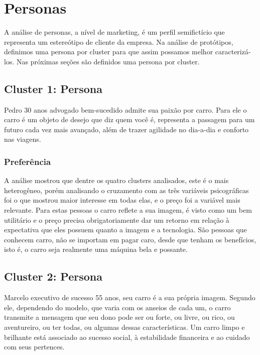 \section{Personas}

A análise de personas, a nível de marketing, é um perfil semifictício
que representa um estereótipo de cliente da empresa. Na análise de
protótipos, definimos uma persona por cluster para que assim possamos
melhor caracterizá-los. Nas próximas seções são definidos uma persona
por cluster.


\subsection{Cluster 1: Persona \nomeCa{}}

Pedro 30 anos advogado bem-sucedido admite sua paixão por carro. Para
ele o carro é um objeto de desejo que diz quem você é, representa
a passagem para um futuro cada vez mais avançado, além de trazer agilidade
no dia-a-dia e conforto nas viagens. 

\subsubsection{Preferência}
A análise mostrou que dentre os quatro clusters analisados, este é o mais heterogêneo,
porém analisando o cruzamento com as três variáveis psicográficas
foi o que mostrou maior interesse em todas elas, e o preço foi a variável
mais relevante. Para estas pessoas o carro reflete a sua imagem, é
visto como um bem utilitário e o preço precisa obrigatoriamente dar
um retorno em relação à expectativa que eles possuem quanto a imagem
e a tecnologia. São pessoas que conhecem carro, não se importam em
pagar caro, desde que tenham os benefícios, isto é, o carro seja realmente
uma máquina bela e possante. 


\subsection{Cluster 2: Persona \nomeCb{}}

Marcelo executivo de sucesso 55 anos, seu carro é a sua própria imagem.
Segundo ele, dependendo do modelo, que varia com os anseios de cada
um, o carro transmite a mensagem que seu dono pode ser ou forte, ou
livre, ou rico, ou aventureiro, ou ter todas, ou algumas dessas características.
Um carro limpo e brilhante está associado ao sucesso social, à estabilidade
financeira e ao cuidado com seus pertences. 

